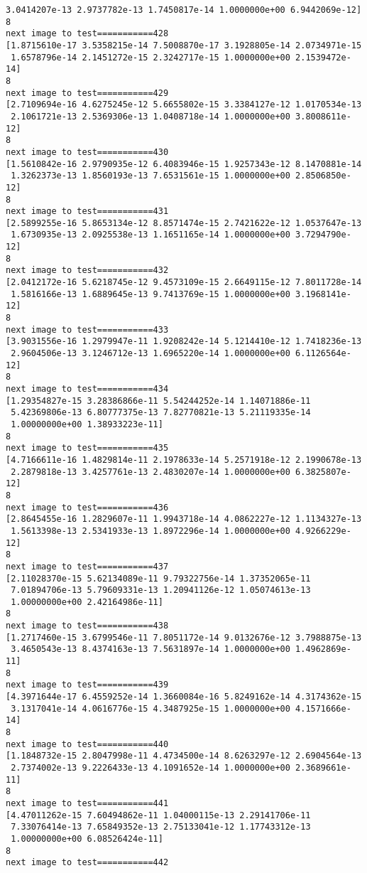 \documentclass[11pt]{article}
\begin{document}
\begin{Verbatim}[commandchars=\\\{\}]
 3.0414207e-13 2.9737782e-13 1.7450817e-14 1.0000000e+00 6.9442069e-12]
8
next image to test===========428
[1.8715610e-17 3.5358215e-14 7.5008870e-17 3.1928805e-14 2.0734971e-15
 1.6578796e-14 2.1451272e-15 2.3242717e-15 1.0000000e+00 2.1539472e-14]
8
next image to test===========429
[2.7109694e-16 4.6275245e-12 5.6655802e-15 3.3384127e-12 1.0170534e-13
 2.1061721e-13 2.5369306e-13 1.0408718e-14 1.0000000e+00 3.8008611e-12]
8
next image to test===========430
[1.5610842e-16 2.9790935e-12 6.4083946e-15 1.9257343e-12 8.1470881e-14
 1.3262373e-13 1.8560193e-13 7.6531561e-15 1.0000000e+00 2.8506850e-12]
8
next image to test===========431
[2.5899255e-16 5.8653134e-12 8.8571474e-15 2.7421622e-12 1.0537647e-13
 1.6730935e-13 2.0925538e-13 1.1651165e-14 1.0000000e+00 3.7294790e-12]
8
next image to test===========432
[2.0412172e-16 5.6218745e-12 9.4573109e-15 2.6649115e-12 7.8011728e-14
 1.5816166e-13 1.6889645e-13 9.7413769e-15 1.0000000e+00 3.1968141e-12]
8
next image to test===========433
[3.9031556e-16 1.2979947e-11 1.9208242e-14 5.1214410e-12 1.7418236e-13
 2.9604506e-13 3.1246712e-13 1.6965220e-14 1.0000000e+00 6.1126564e-12]
8
next image to test===========434
[1.29354827e-15 3.28386866e-11 5.54244252e-14 1.14071886e-11
 5.42369806e-13 6.80777375e-13 7.82770821e-13 5.21119335e-14
 1.00000000e+00 1.38933223e-11]
8
next image to test===========435
[4.7166611e-16 1.4829814e-11 2.1978633e-14 5.2571918e-12 2.1990678e-13
 2.2879818e-13 3.4257761e-13 2.4830207e-14 1.0000000e+00 6.3825807e-12]
8
next image to test===========436
[2.8645455e-16 1.2829607e-11 1.9943718e-14 4.0862227e-12 1.1134327e-13
 1.5613398e-13 2.5341933e-13 1.8972296e-14 1.0000000e+00 4.9266229e-12]
8
next image to test===========437
[2.11028370e-15 5.62134089e-11 9.79322756e-14 1.37352065e-11
 7.01894706e-13 5.79609331e-13 1.20941126e-12 1.05074613e-13
 1.00000000e+00 2.42164986e-11]
8
next image to test===========438
[1.2717460e-15 3.6799546e-11 7.8051172e-14 9.0132676e-12 3.7988875e-13
 3.4650543e-13 8.4374163e-13 7.5631897e-14 1.0000000e+00 1.4962869e-11]
8
next image to test===========439
[4.3971644e-17 6.4559252e-14 1.3660084e-16 5.8249162e-14 4.3174362e-15
 3.1317041e-14 4.0616776e-15 4.3487925e-15 1.0000000e+00 4.1571666e-14]
8
next image to test===========440
[1.1848732e-15 2.8047998e-11 4.4734500e-14 8.6263297e-12 2.6904564e-13
 2.7374002e-13 9.2226433e-13 4.1091652e-14 1.0000000e+00 2.3689661e-11]
8
next image to test===========441
[4.47011262e-15 7.60494862e-11 1.04000115e-13 2.29141706e-11
 7.33076414e-13 7.65849352e-13 2.75133041e-12 1.17743312e-13
 1.00000000e+00 6.08526424e-11]
8
next image to test===========442

\end{Verbatim}
\end{document}
